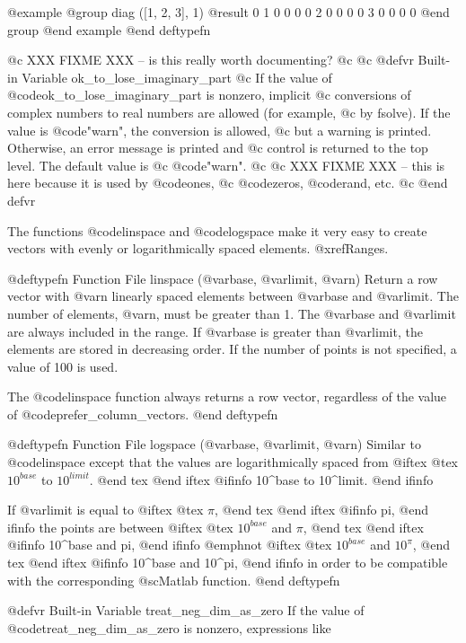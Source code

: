 @example
@group
diag ([1, 2, 3], 1)
     @result{}  0  1  0  0
         0  0  2  0
         0  0  0  3
         0  0  0  0
@end group
@end example
@end deftypefn

@c XXX FIXME XXX -- is this really worth documenting?
@c
@c @defvr {Built-in Variable} ok_to_lose_imaginary_part
@c If the value of @code{ok_to_lose_imaginary_part} is nonzero, implicit
@c conversions of complex numbers to real numbers are allowed (for example,
@c by fsolve).  If the value is @code{"warn"}, the conversion is allowed,
@c but a warning is printed.  Otherwise, an error message is printed and
@c control is returned to the top level.  The default value is
@c @code{"warn"}.
@c 
@c XXX FIXME XXX -- this is here because it is used by @code{ones},
@c @code{zeros}, @code{rand}, etc.
@c @end defvr

The functions @code{linspace} and @code{logspace} make it very easy to
create vectors with evenly or logarithmically spaced elements.
@xref{Ranges}.

@deftypefn {Function File} {} linspace (@var{base}, @var{limit}, @var{n})
Return a row vector with @var{n} linearly spaced elements between
@var{base} and @var{limit}.  The number of elements, @var{n}, must be
greater than 1.  The @var{base} and @var{limit} are always included in
the range.  If @var{base} is greater than @var{limit}, the elements are
stored in decreasing order.  If the number of points is not specified, a
value of 100 is used.

The @code{linspace} function always returns a row vector, regardless of
the value of @code{prefer_column_vectors}.
@end deftypefn

@deftypefn {Function File} {} logspace (@var{base}, @var{limit}, @var{n})
Similar to @code{linspace} except that the values are logarithmically
spaced from
@iftex
@tex
$10^{base}$ to $10^{limit}$.
@end tex
@end iftex
@ifinfo
10^base to 10^limit.
@end ifinfo

If @var{limit} is equal to
@iftex
@tex
$\pi$,
@end tex
@end iftex
@ifinfo
pi,
@end ifinfo
the points are between
@iftex
@tex
$10^{base}$ and $\pi$,
@end tex
@end iftex
@ifinfo
10^base and pi,
@end ifinfo
@emph{not}
@iftex
@tex
$10^{base}$ and $10^{\pi}$,
@end tex
@end iftex
@ifinfo
10^base and 10^pi,
@end ifinfo
in order to  be compatible with the corresponding @sc{Matlab} function.
@end deftypefn

@defvr {Built-in Variable} treat_neg_dim_as_zero
If the value of @code{treat_neg_dim_as_zero} is nonzero, expressions
like

